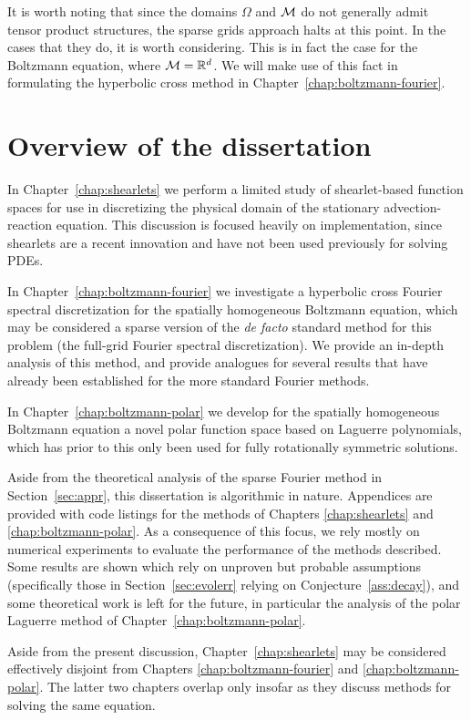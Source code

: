 It is worth noting that since the domains $\Omega$ and $\mathcal{M}$ do not generally admit tensor product structures,
the sparse grids approach halts at this point. In the cases that they do, it is worth considering. This is in
fact the case for the Boltzmann equation, where $\mathcal{M}=\mathbb{R}^d$. We will make use of this fact in formulating the
hyperbolic cross method in Chapter~\ref{chap:boltzmann-fourier}.

\section{Overview of the dissertation}

In Chapter~\ref{chap:shearlets} we perform a limited study of shearlet-based function spaces for use in
discretizing the physical domain of the stationary advection-reaction equation. This discussion is focused
heavily on implementation, since shearlets are a recent innovation and have not been used previously for
solving PDEs.

In Chapter~\ref{chap:boltzmann-fourier} we investigate a hyperbolic cross Fourier spectral discretization for
the spatially homogeneous Boltzmann equation, which may be considered a sparse version of the {\em de facto}
standard method for this problem (the full-grid Fourier spectral discretization). We provide an in-depth
analysis of this method, and provide analogues for several results that have already been established for the
more standard Fourier methods.

In Chapter~\ref{chap:boltzmann-polar} we develop for the spatially homogeneous Boltzmann equation a novel
polar function space based on Laguerre polynomials, which has prior to this only been used for fully
rotationally symmetric solutions.

Aside from the theoretical analysis of the sparse Fourier method in Section~\ref{sec:appr}, this dissertation
is algorithmic in nature. Appendices are provided with code listings for the methods of Chapters
\ref{chap:shearlets} and \ref{chap:boltzmann-polar}. As a consequence of this focus, we rely mostly on
numerical experiments to evaluate the performance of the methods described. Some results are shown which rely
on unproven but probable assumptions (specifically those in Section~\ref{sec:evolerr} relying on
Conjecture~\vref{ass:decay}), and some theoretical work is left for the future, in particular the analysis of
the polar Laguerre method of Chapter~\ref{chap:boltzmann-polar}.

Aside from the present discussion, Chapter~\ref{chap:shearlets} may be considered effectively disjoint from
Chapters \ref{chap:boltzmann-fourier} and \ref{chap:boltzmann-polar}. The latter two chapters overlap only
insofar as they discuss methods for solving the same equation.
